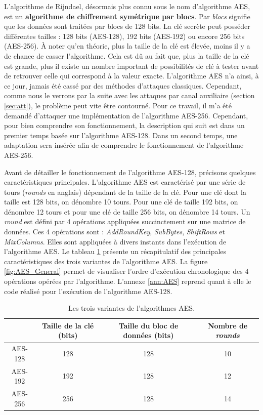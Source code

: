 \documentclass[oneside]{book}
\begin{document}
L'algorithme de Rijndael, désormais plus connu sous le nom d'algorithme AES, est un \textbf{algorithme de chiffrement symétrique par blocs}. Par \textit{blocs} signifie que les données sont traitées par blocs de 128 bits. La clé secrète peut posséder différentes tailles : 128 bits (AES-128), 192 bits (AES-192) ou encore 256 bits (AES-256). À noter qu'en théorie, plus la taille de la clé est élevée, moins il y a de chance de casser l'algorithme. Cela est dû au fait que, plus la taille de la clé est grande, plus il existe un nombre important de possibilités de clé à tester avant de retrouver celle qui correspond à la valeur exacte. L'algorithme AES n'a ainsi, à ce jour, jamais été cassé par des méthodes d'attaques classiques. Cependant, comme nous le verrons par la suite avec les attaques par canal auxiliaire (section \ref{sec:att}), le problème peut vite être contourné. Pour ce travail, il m'a été demandé d'attaquer une implémentation de l'algorithme AES-256. Cependant, pour bien comprendre son fonctionnement, la description qui suit est dans un premier temps basée sur l'algorithme AES-128. Dans un second temps, une adaptation sera insérée afin de comprendre le fonctionnement de l'algorithme AES-256.

Avant de détailler le fonctionnement de l'algorithme AES-128, précisons quelques caractéristiques principales. L'algorithme AES est caractérisé par une série de tours (\textit{rounds} en anglais) dépendant de la taille de la clé. Pour une clé dont la taille est 128 bits, on dénombre 10 tours. Pour une clé de taille 192 bits, on dénombre 12 tours et pour une clé de taille 256 bits, on dénombre 14 tours. Un \textit{round} est défini par 4 opérations appliquées succinctement sur une matrice de données. Ces 4 opérations sont : \textit{AddRoundKey}, \textit{SubBytes}, \textit{ShiftRows} et \textit{MixColumns}. Elles sont appliquées à divers instants dans l'exécution de l'algorithme AES. Le tableau \ref{tab:AES} présente un récapitulatif des principales caractéristiques des trois variantes de l'algorithme AES. La figure \ref{fig:AES_General} permet de visualiser l'ordre d'exécution chronologique des 4 opérations opérées par l'algorithme. L'annexe \ref{ann:AES} reprend quant à elle le code réalisé pour l'exécution de l'algorithme AES-128.

\vspace{0.5cm}

\begin{table}[htbp]
	\centering
	\begin{tabular}{|c|c|c|c|}
    		\hline
   		  & Taille de la clé (bits) & Taille du bloc de données (bits) & Nombre de \textit{rounds} \\ \hline
   		  AES-128 & 128 & 128 & 10 \\ \hline
   		  AES-192 & 192 & 128 & 12 \\ \hline
   		  AES-256 & 256 & 128 & 14 \\ \hline    		
	\end{tabular}
 	\caption{Les trois variantes de l'algorithmes AES.}
 	\label{tab:AES}
\end{table}
\end{document}
